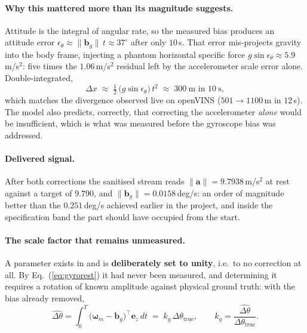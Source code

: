 \paragraph{Why this mattered more than its magnitude suggests.} Attitude is the
integral of angular rate, so the measured bias produces an attitude error
$\epsilon_\theta \approx \lVert \mathbf{b}_g \rVert\, t \approx 37^\circ$ after
only $10$\,s. That error mis-projects gravity into the body frame, injecting a
phantom horizontal specific force
$g\sin\epsilon_\theta \approx 5.9$\,m/s$^2$: five times the
$1.06$\,m/s$^2$ residual left by the accelerometer scale error alone.
Double-integrated,
\begin{equation}
\Delta x \;\approx\; \tfrac{1}{2}\,\bigl(g \sin \epsilon_\theta\bigr)\, t^2
  \;\approx\; 300\ \text{m in } 10\ \text{s},
\label{eq:attitudeleak}
\end{equation}
which matches the divergence observed live on openVINS ($501 \rightarrow
1100$\,m in $12$\,s). The model also predicts, correctly, that correcting the
accelerometer \emph{alone} would be insufficient, which is what was measured
before the gyroscope bias was addressed.

\paragraph{Delivered signal.} After both corrections the sanitised stream reads
$\lVert \mathbf{a} \rVert = 9.7938$\,m/s$^2$ at rest against a target of
$9.790$, and $\lVert \mathbf{b}_g \rVert = 0.0158$\,deg/s: an order of
magnitude better than the $0.251$\,deg/s achieved earlier in the project, and
inside the specification band the part should have occupied from the start.

\paragraph{The scale factor that remains unmeasured.} A
 parameter exists in
 and is \textbf{deliberately set to unity}, i.e.\ to no
correction at all. By Eq.~(\ref{eq:gyrorest}) it had never been measured, and
determining it requires a rotation of known amplitude against physical ground
truth: with the bias already removed,
\begin{equation}
\widehat{\Delta\theta} = \int_{0}^{T}
  \bigl(\boldsymbol{\omega}_m - \mathbf{b}_g\bigr)^{\!\top}\!\mathbf{e}_z \,dt
  \;=\; k_g\,\Delta\theta_{\text{true}} ,
\qquad
k_g = \frac{\widehat{\Delta\theta}}{\Delta\theta_{\text{true}}} .
\label{eq:gyroscaleobs}
\end{equation}

